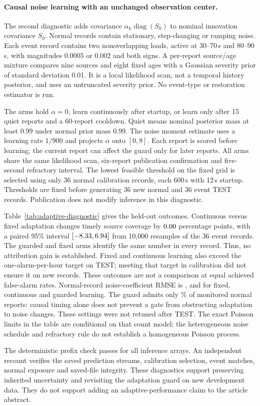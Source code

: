 \paragraph{Causal noise learning with an unchanged observation center.}
The second diagnostic adds covariance $\alpha_k\operatorname{diag}(S_0)$
to nominal innovation covariance $S_0$. Normal records contain stationary,
step-changing or ramping noise. Each event record contains two nonoverlapping
loads, active at 30--70\,s and 80--90\,s, with magnitudes 0.0005 or 0.002
and both signs. A per-report source/age mixture compares nine sources and
eight fixed ages with a Gaussian severity prior of standard deviation 0.01.
It is a local likelihood scan, not a temporal history posterior, and uses
an untruncated severity prior. No event-type or restoration estimator is run.

The arms hold $\alpha=0$, learn continuously after startup, or learn only
after 15 quiet reports and a 60-report cooldown. Quiet means nominal
posterior mass at least 0.99 under normal prior mass 0.99. The noise moment
estimate uses a learning rate $1/900$ and projects $\alpha$ onto $[0,8]$.
Each report is scored before learning; the current report can affect the
guard only for later reports. All arms share the same likelihood scan,
six-report publication confirmation and five-second refractory interval.
The lowest feasible threshold on the fixed grid is selected using only
36 normal calibration records, each 600\,s with 12\,s startup. Thresholds
are fixed before generating 36 new normal and 36 event TEST records.
Publication does not modify inference in this diagnostic.


Table~\ref{tab:adaptive-diagnostic} gives the held-out outcomes.
Continuous versus fixed adaptation changes timely source coverage by
$0.00{}$ percentage points, with a paired 95\% interval
$[-8.33{},6.94{}]$ from 10,000 resamples of the 36 event records.
The guarded and fixed arms identify the same number in every record.
Thus, no attribution gain is established. Fixed and continuous learning
also exceed the one-alarm-per-hour target on TEST; meeting that target in
calibration did not ensure it on new records. These outcomes are not a
comparison at equal achieved false-alarm rates. Normal-record noise-coefficient
RMSE is \FixedNoiseRmse{}, \ContNoiseRmse{} and \GuardNoiseRmse{} for fixed,
continuous and guarded learning. The guard admits only \GateFraction{}\%
of monitored normal reports: causal timing alone does not prevent a gate
from obstructing adaptation to noise changes. These settings were not
retuned after TEST. The exact Poisson limits in the table are conditional
on that count model; the heterogeneous noise schedule and refractory rule
do not establish a homogeneous Poisson process.

The deterministic prefix check passes for all inference arrays. An
independent recount verifies the saved prediction streams, calibration
selection, event matches, normal exposure and saved-file integrity. These
diagnostics support preserving inherited uncertainty and revisiting the
adaptation guard on new development data. They do not support adding an
adaptive-performance claim to the article abstract.
